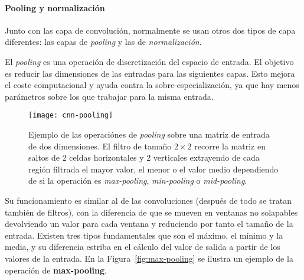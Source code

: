 \paragraph{Pooling y normalización}

Junto con las capa de convolución, normalmente se usan otros dos tipos de capa diferentes: las capas de \textit{pooling} y las de \textit{normalización}.

El \textit{pooling} es una operación de discretización del espacio de entrada. El objetivo es reducir las dimensiones de las entradas para las siguientes capas. Esto mejora el coste computacional y ayuda contra la sobre-especialización, ya que hay menos parámetros sobre los que trabajar para la misma entrada.


\begin{figure}
	\centering
	\texttt{[image: cnn-pooling]}
	\caption[Ejemplo de las operaciónes de \textit{pooling}.]{Ejemplo de las operaciónes de \textit{pooling} sobre una matriz de entrada de dos dimensiones. El filtro de tamaño $2 \times 2$ recorre la matriz en saltos de 2 celdas horizontales y 2 verticales extrayendo de cada región filtrada el mayor valor, el menor o el valor medio dependiendo de si la operación es \textit{max-pooling}, \textit{min-pooling} o \textit{mid-pooling}.}
	\label{fig:cnn-pooling}
\end{figure}

Su funcionamiento es similar al de las convoluciones (después de todo se tratan también de filtros), con la diferencia de que se mueven en ventanas no solapables devolviendo un valor para cada ventana y reduciendo por tanto el tamaño de la entrada. Existen tres tipos fundamentales que son el máximo, el mínimo y la media, y su diferencia estriba en el cálculo del valor de salida a partir de los valores de la entrada. En la Figura~\ref{fig:max-pooling} se ilustra un ejemplo de la operación de \textbf{max-pooling}.

